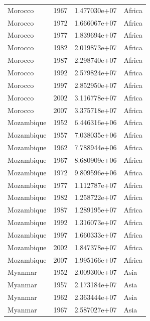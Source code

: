 \documentclass[
  letterpaper,
  DIV=11,
  numbers=noendperiod]{scrreprt}
\begin{document}
\begin{tcolorbox}
\begin{tabular}{lrrl}
Morocco                  &  1967 &  1.477030e+07 &    Africa \\
Morocco                  &  1972 &  1.666067e+07 &    Africa \\
Morocco                  &  1977 &  1.839694e+07 &    Africa \\
Morocco                  &  1982 &  2.019873e+07 &    Africa \\
Morocco                  &  1987 &  2.298740e+07 &    Africa \\
Morocco                  &  1992 &  2.579824e+07 &    Africa \\
Morocco                  &  1997 &  2.852950e+07 &    Africa \\
Morocco                  &  2002 &  3.116778e+07 &    Africa \\
Morocco                  &  2007 &  3.375718e+07 &    Africa \\
Mozambique               &  1952 &  6.446316e+06 &    Africa \\
Mozambique               &  1957 &  7.038035e+06 &    Africa \\
Mozambique               &  1962 &  7.788944e+06 &    Africa \\
Mozambique               &  1967 &  8.680909e+06 &    Africa \\
Mozambique               &  1972 &  9.809596e+06 &    Africa \\
Mozambique               &  1977 &  1.112787e+07 &    Africa \\
Mozambique               &  1982 &  1.258722e+07 &    Africa \\
Mozambique               &  1987 &  1.289195e+07 &    Africa \\
Mozambique               &  1992 &  1.316073e+07 &    Africa \\
Mozambique               &  1997 &  1.660333e+07 &    Africa \\
Mozambique               &  2002 &  1.847378e+07 &    Africa \\
Mozambique               &  2007 &  1.995166e+07 &    Africa \\
Myanmar                  &  1952 &  2.009300e+07 &      Asia \\
Myanmar                  &  1957 &  2.173184e+07 &      Asia \\
Myanmar                  &  1962 &  2.363444e+07 &      Asia \\
Myanmar                  &  1967 &  2.587027e+07 &      Asia \\

\end{tabular}
\end{tcolorbox}
\end{document}
